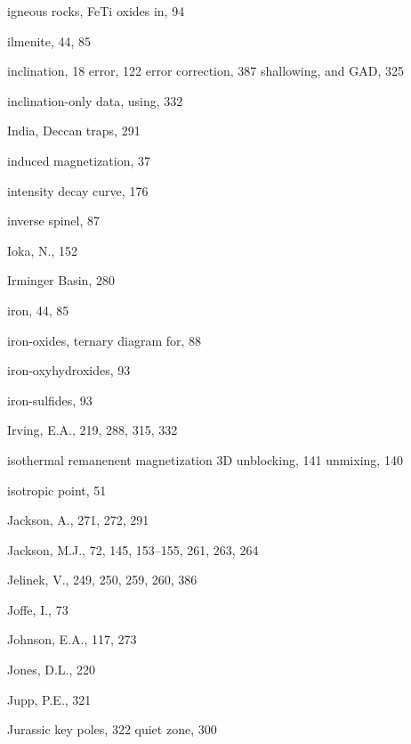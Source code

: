 \documentclass[,plain]{tauxe}
\begin{document}
\begin{theindex}
  \item igneous rocks, FeTi oxides in, 94
  \item ilmenite, 44, 85
  \item inclination, 18
    \subitem error, 122
      \subitem error correction, 387
  \subitem shallowing, and GAD, 325
  \item inclination-only data, using, 332
  \item India, Deccan traps, 291
  \item induced magnetization, 37
  \item intensity decay curve, 176
  \item inverse spinel, 87
  \item Ioka, N., 152
  \item Irminger Basin, 280
  \item iron, 44, 85
  \item iron-oxides, ternary diagram for, 88
  \item iron-oxyhydroxides, 93
  \item iron-sulfides, 93
  \item Irving, E.A., 219, 288, 315, 332
  \item isothermal remanenent magnetization
    \subitem 3D unblocking, 141
    \subitem unmixing, 140
  \item isotropic point, 51

  \indexspace

  \item Jackson, A., 271, 272, 291
  \item Jackson, M.J., 72, 145, 153--155, 261, 263, 264
  \item Jelinek, V., 249, 250, 259, 260, 386
  \item Joffe, I., 73
  \item Johnson, E.A., 117, 273
  \item Jones, D.L., 220
  \item Jupp, P.E., 321
  \item Jurassic 
	\subitem key poles, 322
	\subitem quiet zone, 300

  \indexspace


\end{theindex}
\end{document}
